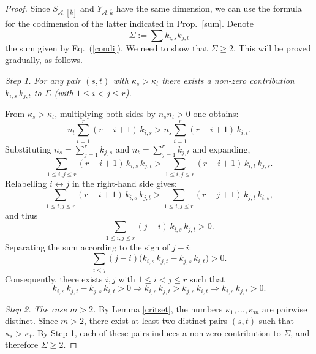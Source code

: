 \documentclass[12pt]{amsart}
\newtheorem{cor}[thm]{Corollary}
\theoremstyle{definition}
\theoremstyle{remark}
\newcommand{\vk}{\overline{k}}
\newcommand{\A}{{\mathcal A}}
\newcommand{\be}{\A, \vk}
\begin{document}

\begin{proof} Since $S_{\A, [\vk]}$ and $Y_{\be}$ have the same dimension, we can use the formula for the codimension of the latter indicated in Prop.~\ref{sum}.
 Denote $$\Sigma:= \sum k_{i,s} k_{j,t}$$ the sum given by Eq.~(\ref{condi}). We need to show that  $\Sigma \ge 2$. This will be proved gradually, as follows.


{\it Step 1.} {\it For any pair $(s, t)$ with $\kappa_s > \kappa_t$ there exists a non-zero contribution $k_{i,s} \, k_{j,t}$ to $\Sigma$ (with $1\le i<j\le r$).}

From $\kappa_s > \kappa_t$, multiplying both sides by $n_s n_t > 0$ one obtains:
\[
  n_t \sum_{i=1}^r (r-i+1)\,k_{i,s} > n_s \sum_{i=1}^r (r-i+1)\,k_{i,t}.
\]
Substituting $n_s = \sum_{j=1}^r k_{j,s}$ and $n_t = \sum_{j=1}^r k_{j,t}$ and expanding,
\[
  \sum_{1\le i,j\le r} (r-i+1)\,k_{i,s}\,k_{j,t} >\sum_{1\le i,j\le r}(r-i+1)\,k_{i,t}\,k_{j,s}.
\]
Relabelling $i \leftrightarrow j$ in the right-hand side gives:
\[
  \sum_{1\le i,j\le r}(r-i+1)\,k_{i,s}\,k_{j,t} >\sum_{1\le i,j\le r}(r-j+1)\,k_{j,t}\,k_{i,s},
\]
and thus
\[
  \sum_{1\le i,j\le r}(j - i)\,k_{i,s}\,k_{j,t} >0.
\]
Separating the sum according to the sign of $j - i$:
\begin{equation}
  \sum_{i < j}(j-i)\bigl(k_{i,s}\,k_{j,t} - k_{j,s}\,k_{i,t}\bigr) > 0. \label{star}
\end{equation}
Consequently, there exists $i,j$ with $1\le i<j\le r$ such that
$$k_{i,s}\,k_{j,t} - k_{j,s}\,k_{i,t}>0 \Rightarrow k_{i,s}\,k_{j,t} > k_{j,s}\,k_{i,t} \Rightarrow k_{i,s}\,k_{j,t} >0.$$



{\it Step 2.} {\it The case $m>2$.}  By Lemma \ref{critset}, the numbers $\kappa_1, \ldots, \kappa_m$ are pairwise distinct. Since $m> 2$, there exist at least two distinct pairs $(s,t)$ such that $\kappa_s > \kappa_t$. By Step 1, each of these pairs induces a non-zero contribution to
$\Sigma$, and therefore $\Sigma \ge 2$.


\end{proof}
\end{document}
